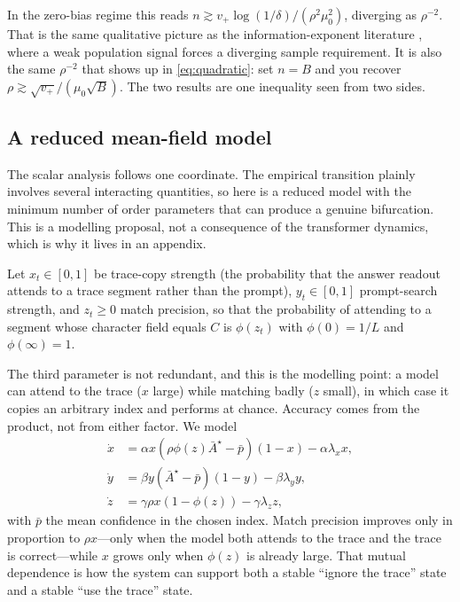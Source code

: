 \documentclass{article}
\theoremstyle{plain}
\theoremstyle{definition}
\theoremstyle{remark}
\newcommand{\1}{\mathbf{1}}
\begin{document}
In the zero-bias regime this reads $n\gtrsim v_+\log(1/\delta)/(\rho^2\mu_0^2)$,
diverging as $\rho^{-2}$. That is the same qualitative picture as the
information-exponent literature \citep{benarous2021online,abbe2023sgd}, where a
weak population signal forces a diverging sample requirement. It is also the same
$\rho^{-2}$ that shows up in \eqref{eq:quadratic}: set $n = B$ and you recover
$\rho\gtrsim\sqrt{v_+}/(\mu_0\sqrt B)$. The two results are one inequality seen
from two sides.

\subsection{A reduced mean-field model}
\label{app:meanfield}

The scalar analysis follows one coordinate. The empirical transition plainly
involves several interacting quantities, so here is a reduced model with the
minimum number of order parameters that can produce a genuine bifurcation. This
is a modelling proposal, not a consequence of the transformer dynamics, which is
why it lives in an appendix.

Let $x_t\in[0,1]$ be trace-copy strength (the probability that the answer readout
attends to a trace segment rather than the prompt), $y_t\in[0,1]$ prompt-search
strength, and $z_t\ge0$ match precision, so that the probability of attending to
a segment whose character field equals $C$ is $\phi(z_t)$ with $\phi(0) = 1/L$ and
$\phi(\infty) = 1$.

The third parameter is not redundant, and this is the modelling point: a model
can attend to the trace ($x$ large) while matching badly ($z$ small), in which
case it copies an arbitrary index and performs at chance. Accuracy comes from the
product, not from either factor. We model
\begin{align*}
\dot x &= \alpha x(\rho\phi(z)\bar A^\star-\bar p)(1-x)-\alpha\lambda_xx,\\
\dot y &= \beta y(\bar A^\star-\bar p)(1-y)-\beta\lambda_yy,\\
\dot z &= \gamma\rho x(1-\phi(z))-\gamma\lambda_zz,
\end{align*}
with $\bar p$ the mean confidence in the chosen index. Match precision improves
only in proportion to $\rho x$---only when the model both attends to the trace
and the trace is correct---while $x$ grows only when $\phi(z)$ is already large.
That mutual dependence is how the system can support both a stable ``ignore the
trace'' state and a stable ``use the trace'' state.
\end{document}
